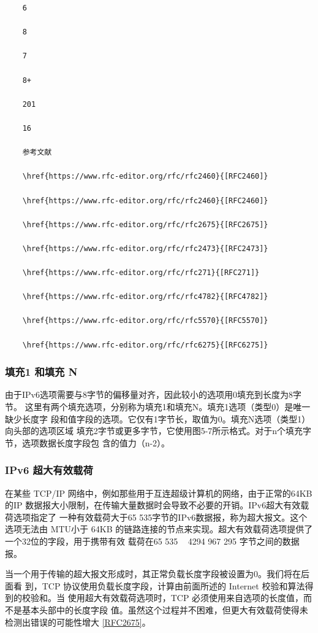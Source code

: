 \begin{verbatim}
    6
    
    8
    
    7
    
    8+
    
    201
    
    16
    
    参考文献
    
    \href{https://www.rfc-editor.org/rfc/rfc2460}{[RFC2460]}
    
    \href{https://www.rfc-editor.org/rfc/rfc2460}{[RFC2460]}
    
    \href{https://www.rfc-editor.org/rfc/rfc2675}{[RFC2675]}
    
    \href{https://www.rfc-editor.org/rfc/rfc2473}{[RFC2473]}
    
    \href{https://www.rfc-editor.org/rfc/rfc271}{[RFC271]}
    
    \href{https://www.rfc-editor.org/rfc/rfc4782}{[RFC4782]}
    
    \href{https://www.rfc-editor.org/rfc/rfc5570}{[RFC5570]}
    
    \href{https://www.rfc-editor.org/rfc/rfc6275}{[RFC6275]}
\end{verbatim}

\subsubsection{填充1 和填充 N}
由于IPv6选项需要与8字节的偏移量对齐，因此较小的选项用0填充到长度为8字节。
这里有两个填充选项，分别称为填充1和填充N。填充1选项（类型0）是唯一缺少长度字
段和值字段的选项。它仅有1字节长，取值为0。填充N选项（类型1）向头部的选项区域
填充2字节或更多字节，它使用图5-7所示格式。对于n个填充字节，选项数据长度字段包
含的值力（n-2）。

\subsubsection{IPv6 超大有效载荷}

在某些 TCP/IP 网络中，例如那些用于互连超级计算机的网络，由于正常的64KB 的IP
数据报大小限制，在传输大量数据时会导致不必要的开销。IPv6超大有效载荷选项指定了
一种有效载荷大于65 535字节的IPv6数据报，称为超大报文。这个选项无法由 MTU小于
64KB 的链路连接的节点来实现。超大有效载荷选项提供了一个32位的字段，用于携带有效
载荷在65 535 ~ 4294 967 295 字节之间的数据报。

当一个用于传输的超大报文形成时，其正常负载长度字段被设置为0。我们将在后面看
到，TCP 协议使用负载长度字段，计算由前面所述的 Internet 校验和算法得到的校验和。当
使用超大有效载荷选项时，TCP 必须使用来自选项的长度值，而不是基本头部中的长度字段
值。虽然这个过程并不困难，但更大有效载荷使得未检测出错误的可能性增大 \href{https://www.rfc-editor.org/rfc/rfc2675}{[RFC2675]}。

